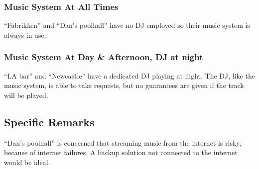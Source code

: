 \subsubsection{Music System At All Times}
\label{ssub:music_system_at_all_times}

\enquote{Fabrikken} and \enquote{Dan's poolhall} have no DJ employed so their music system is always in use.

\subsubsection{Music System At Day \& Afternoon, DJ at night}
\label{ssub:music_system_at_day_and_afternoon_dj_at_night}

\enquote{LA bar} and \enquote{Newcastle} have a dedicated DJ playing at night. The DJ, like the music system, is able to take requests, but no guarantees are given if the track will be played. 

\subsection{Specific Remarks}
\label{sub:specific_remarks}

\enquote{Dan's poolhall} is concerned that streaming music from the internet is risky, because of internet failures. A backup solution not connected to the internet would be ideal.






